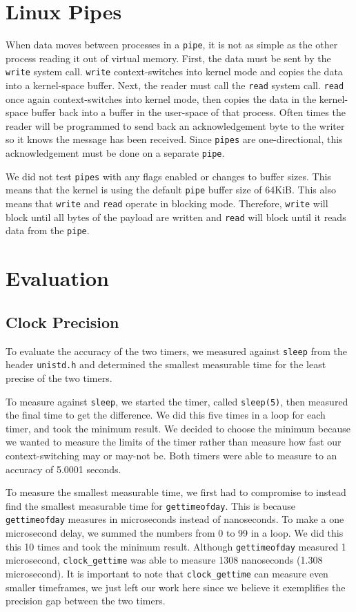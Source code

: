 \documentclass[11pt, twocolumn]{article}
\newcommand{\cgt}{\texttt{clock\_gettime}\xspace}
\newcommand{\gtod}{\texttt{gettimeofday}\xspace}
\newcommand{\pipe}{\texttt{pipe}\xspace}
\newcommand{\pipes}{\texttt{pipes}\xspace}
\begin{document}
\section{Linux Pipes}
When data moves between processes in a \pipe, it is not as simple as the other process reading it out of virtual memory.
First, the data must be sent by the \texttt{write} system call. \texttt{write} context-switches into kernel mode and
copies the data into a kernel-space buffer.
Next, the reader must call the \texttt{read} system call. \texttt{read} once again context-switches into kernel mode,
then copies the data in the kernel-space buffer back into a buffer in the user-space of that process.
Often times the reader will be programmed to send back an acknowledgement byte to the writer so it knows the message has
been received. Since \pipes are one-directional, this acknowledgement must be done on a separate \pipe.

We did not test \pipes with any flags enabled or changes to buffer sizes. This means that the kernel is using
the default \pipe buffer size of 64KiB. This also means that \texttt{write} and \texttt{read} operate in blocking mode.
Therefore, \texttt{write} will block until all bytes of the payload are written and \texttt{read} will block
until it reads data from the \pipe.

\section{Evaluation}

\subsection*{Clock Precision}
To evaluate the accuracy of the two timers, we measured against
\texttt{sleep} from the header \texttt{unistd.h} and determined 
the smallest measurable time for the least precise of the two timers.

To measure against \texttt{sleep}, we started the timer, called \texttt{sleep(5)}, then 
measured the final time to get the difference. We did this five times in a loop for each timer,
and took the minimum result. We decided to choose the minimum because we wanted to measure
the limits of the timer rather than measure how fast our context-switching may or may-not be.
Both timers were able to measure to an accuracy of 5.0001 seconds.

To measure the smallest measurable time, we first had to compromise to
instead find the smallest measurable time for \gtod. 
This is because \gtod measures in microseconds instead of 
nanoseconds. To make a one microsecond delay, we summed the numbers from 0 to 99 in a loop. 
We did this this 10 times and took the minimum result. 
Although \gtod measured 1 microsecond, \cgt was able to measure 1308 nanoseconds (1.308 microsecond).
It is important to note that \cgt can measure even smaller timeframes, we just left our work here
since we believe it exemplifies the precision gap between the two timers.
\end{document}
